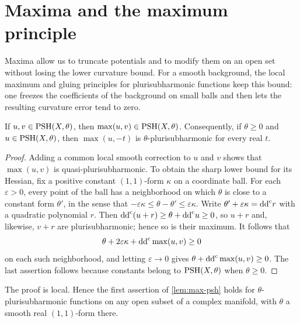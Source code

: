 \section{Maxima and the maximum principle}

Maxima allow us to truncate potentials and to modify them on an open set without losing the lower curvature bound. For a smooth background, the local maximum and gluing principles for plurisubharmonic functions keep this bound: one freezes the coefficients of the background on small balls and then lets the resulting curvature error tend to zero.

\begin{lemma}\label{lem:max-psh}
If $u,v\in\mathrm{PSH}(X,\theta)$, then $\max(u,v)\in\mathrm{PSH}(X,\theta)$. Consequently, if $\theta\geq0$ and $u\in\mathrm{PSH}(X,\theta)$, then $\max(u,-t)$ is $\theta$-plurisubharmonic for every real $t$.
\end{lemma}
\begin{proof}
Adding a common local smooth correction to $u$ and $v$ shows that $\max(u,v)$ is quasi-plurisubharmonic. To obtain the sharp lower bound for its Hessian, fix a positive constant $(1,1)$-form $\kappa$ on a coordinate ball. For each $\varepsilon>0$, every point of the ball has a neighborhood on which $\theta$ is close to a constant form $\theta'$, in the sense that $-\varepsilon\kappa\leq\theta-\theta'\leq\varepsilon\kappa$. Write $\theta'+\varepsilon\kappa=\mathrm{dd}^{\mathrm{c}} r$ with a quadratic polynomial $r$. Then $\mathrm{dd}^{\mathrm{c}}(u+r)\geq\theta+\mathrm{dd}^{\mathrm{c}} u\geq0$, so $u+r$ and, likewise, $v+r$ are plurisubharmonic; hence so is their maximum. It follows that
\[
 \theta+2\varepsilon\kappa+\mathrm{dd}^{\mathrm{c}}\max(u,v)\geq0
\]
on each such neighborhood, and letting $\varepsilon\to0$ gives $\theta+\mathrm{dd}^{\mathrm{c}}\max(u,v)\geq0$. The last assertion follows because constants belong to $\mathrm{PSH}(X,\theta)$ when $\theta\geq0$.
\end{proof}

The proof is local. Hence the first assertion of \cref{lem:max-psh} holds for $\theta$-plurisubharmonic functions on any open subset of a complex manifold, with $\theta$ a smooth real $(1,1)$-form there.


